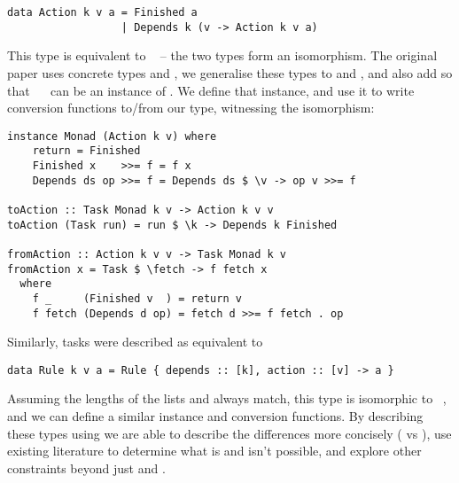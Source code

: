 \vspace{1mm}
\begin{verbatim}
data Action k v a = Finished a
                  | Depends k (v -> Action k v a)
\end{verbatim}
\vspace{1mm}

\noindent
This type is equivalent to ~ -- the two types form an
isomorphism. The original paper uses concrete types  and , we
generalise these types to  and , and also add  so that
~~ can be an instance of . We define that
 instance, and use it to write conversion functions to/from our
 type, witnessing the isomorphism:

\vspace{1mm}
\begin{verbatim}
instance Monad (Action k v) where
    return = Finished
    Finished x    >>= f = f x
    Depends ds op >>= f = Depends ds $ \v -> op v >>= f

toAction :: Task Monad k v -> Action k v v
toAction (Task run) = run $ \k -> Depends k Finished

fromAction :: Action k v v -> Task Monad k v
fromAction x = Task $ \fetch -> f fetch x
  where
    f _     (Finished v  ) = return v
    f fetch (Depends d op) = fetch d >>= f fetch . op
\end{verbatim}
\vspace{1mm}

\noindent
Similarly, \Make tasks were described as equivalent to

\vspace{1mm}
\begin{verbatim}
data Rule k v a = Rule { depends :: [k], action :: [v] -> a }
\end{verbatim}
\vspace{1mm}

Assuming the lengths of the lists \hs{[@@k]} and \hs{[@@v]} always match, this
type is isomorphic to ~, and we can define a similar
 instance and conversion functions. By describing these types
using  we are able to describe the differences more concisely
( vs ), use existing literature to determine what is
and isn't possible, and explore other constraints beyond just  and
.


